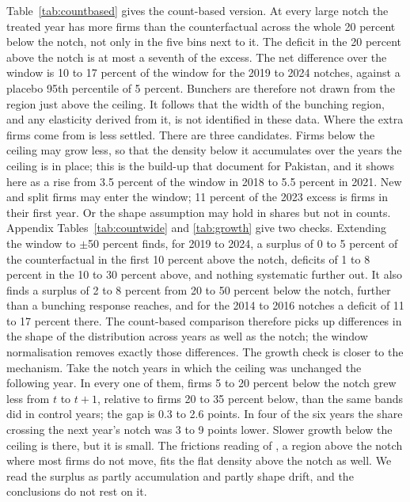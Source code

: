 \documentclass[12pt]{article}
\begin{document}
Table~\ref{tab:countbased} gives the count-based version. At every large notch the treated year has more firms than the counterfactual across the whole 20 percent below the notch, not only in the five bins next to it. The deficit in the 20 percent above the notch is at most a seventh of the excess. The net difference over the window is 10 to 17 percent of the window for the 2019 to 2024 notches, against a placebo 95th percentile of 5 percent. Bunchers are therefore not drawn from the region just above the ceiling. It follows that the width of the bunching region, and any elasticity derived from it, is not identified in these data. Where the extra firms come from is less settled. There are three candidates. Firms below the ceiling may grow less, so that the density below it accumulates over the years the ceiling is in place; this is the build-up that \citet{kleven2013} document for Pakistan, and it shows here as a rise from 3.5 percent of the window in 2018 to 5.5 percent in 2021. New and split firms may enter the window; 11 percent of the 2023 excess is firms in their first year. Or the shape assumption may hold in shares but not in counts. Appendix Tables~\ref{tab:countwide} and \ref{tab:growth} give two checks. Extending the window to $\pm$50 percent finds, for 2019 to 2024, a surplus of 0 to 5 percent of the counterfactual in the first 10 percent above the notch, deficits of 1 to 8 percent in the 10 to 30 percent above, and nothing systematic further out. It also finds a surplus of 2 to 8 percent from 20 to 50 percent below the notch, further than a bunching response reaches, and for the 2014 to 2016 notches a deficit of 11 to 17 percent there. The count-based comparison therefore picks up differences in the shape of the distribution across years as well as the notch; the window normalisation removes exactly those differences. The growth check is closer to the mechanism. Take the notch years in which the ceiling was unchanged the following year. In every one of them, firms 5 to 20 percent below the notch grew less from $t$ to $t+1$, relative to firms 20 to 35 percent below, than the same bands did in control years; the gap is 0.3 to 2.6 points. In four of the six years the share crossing the next year's notch was 3 to 9 points lower. Slower growth below the ceiling is there, but it is small. The frictions reading of \citet{kleven2013}, a region above the notch where most firms do not move, fits the flat density above the notch as well. We read the surplus as partly accumulation and partly shape drift, and the conclusions do not rest on it.
\end{document}

